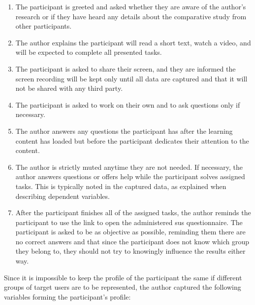 \begin{enumerate}
    \item The participant is greeted and asked whether they are aware of the author's research or if they have heard any details about the comparative study from other participants.
    \item The author explains the participant will read a short text, watch a video, and will be expected to complete all presented tasks.
    \item The participant is asked to share their screen, and they are informed the screen recording will be kept only until all data are captured and that it will not be shared with any third party.
    \item The participant is asked to work on their own and to ask questions only if necessary.
    \item The author answers any questions the participant has after the learning content has loaded but before the participant dedicates their attention to the content.
    \item The author is strictly muted anytime they are not needed. If necessary, the author answers questions or offers help while the participant solves assigned tasks. This is typically noted in the captured data, as explained when describing dependent variables.
    \item After the participant finishes all of the assigned tasks, the author reminds the participant to use the link to open the administered \gls{sus} questionnaire. The participant is asked to be as objective as possible, reminding them there are no correct answers and that since the participant does not know which group they belong to, they should not try to knowingly influence the results either way.
\end{enumerate}

Since it is impossible to keep the profile of the participant the same if different groups of target users are to be represented, the author captured the following variables forming the participant's profile:

